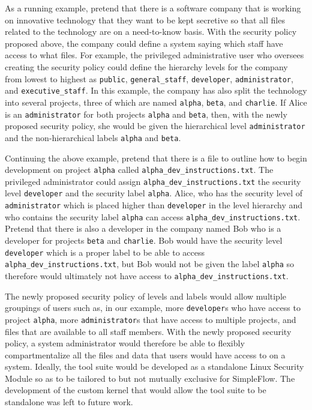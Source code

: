 As a running example, pretend that
there is a software company that is working on innovative technology that they want
to be kept secretive so that all files related to the technology are on a need-to-know basis. 
With the security policy proposed above, the company could define a system saying which staff have
access to what files. For example, the privileged administrative user who oversees creating the security policy 
could define the hierarchy levels for the company from lowest to highest as
\texttt{public}, \texttt{general\_staff}, \texttt{developer}, \texttt{administrator}, and \texttt{executive\_staff}.
In this example, the company has also split the technology into several projects, 
three of which are named \texttt{alpha}, \texttt{beta}, and \texttt{charlie}. If Alice is an \texttt{administrator} for
both projects \texttt{alpha} and \texttt{beta}, then, with the newly proposed security policy,
she would be given the hierarchical level \texttt{administrator} and the non-hierarchical labels
\texttt{alpha} and \texttt{beta}. 

Continuing the above example, pretend that there is a file to outline how to begin development on project \texttt{alpha} called
\texttt{alpha}\texttt{\_dev}\texttt{\_instructions.txt}. The privileged administrator could assign \texttt{alpha}\texttt{\_dev}\texttt{\_instructions.txt} 
the security level \texttt{developer} and the security label \texttt{alpha}. Alice, who has the security level of \texttt{administrator}
which is placed higher than \texttt{developer} in the level hierarchy 
and who contains the security label \texttt{alpha} can access \texttt{alpha}\texttt{\_dev}\texttt{\_instructions.txt}.
Pretend that there is also a developer in the company named Bob who is a developer for projects \texttt{beta} and \texttt{charlie}. Bob would
have the security level \texttt{developer} which is a proper label to be able to access \texttt{alpha}\texttt{\_dev}\texttt{\_instructions.txt}, but Bob would not
be given the label \texttt{alpha} so therefore would ultimately not have access to \texttt{alpha}\texttt{\_dev}\texttt{\_instructions.txt}.

The newly proposed security policy of levels and labels 
would allow multiple groupings of users such as, in our example, 
more \texttt{developer}s who have access to project \texttt{alpha}, more \texttt{administrator}s that have access to multiple projects,
and files that are available to all staff members. With the newly proposed security policy, a system administrator would therefore be able 
to flexibly compartmentalize all the files and data that users would have 
access to on a system. Ideally, the tool suite would be developed as a standalone 
Linux Security Module so as to be tailored to but not mutually 
exclusive for SimpleFlow. The development of the custom kernel that would allow the tool suite to be standalone
was left to future work.
\clearpage

